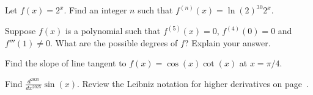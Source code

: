 \documentclass[../main.tex]{subfiles}
\begin{document}
  \begin{example}
    Let \(f(x) = 2^{x}\). Find an integer \(n\) such that \(f^{(n)}(x) = \ln(2)^{30} 2^{x}\).

  \end{example}

  \begin{example}
    Suppose \(f(x)\) is a polynomial such that \(f^{(5)}(x) = 0\), \(f^{(4)}(0) = 0\) and \(f'''(1) \ne 0\). What are the possible degrees of \(f\)? Explain your answer.

  \end{example}
  \clearpage

  \begin{example}
    Find the slope of line tangent to \(f(x) = \cos(x)\cot(x)\) at \(x = \pi/4\). 

  \end{example}

  \begin{example}
    Find \(\frac{d^{2025}}{dx^{2025}} \sin(x)\). Review the Leibniz notation for higher derivatives on page~\pageref{page:higher-derivatives}.

  \end{example}
\end{document}
